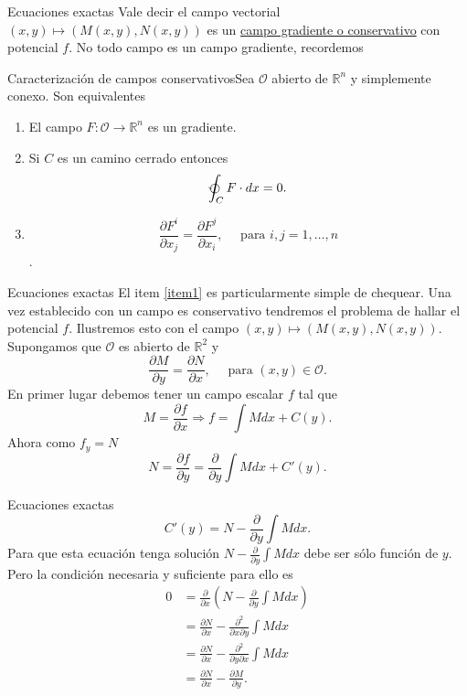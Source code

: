 \documentclass[handout,hyperref={colorlinks=true}]{beamer}
\newcommand{\rr}{\mathbb{R}}
\newcommand{\der}[2]{\frac{\partial #1}{\partial #2}}
\newcommand{\nl}{\onslide<+-> }
\begin{document}
\begin{frame}{Ecuaciones exactas}\label{camposconservativos}
\nl Vale decir el campo vectorial $(x,y)\mapsto (M(x,y),N(x,y))$ es un \href{http://es.wikipedia.org/wiki/Fuerza_conservativa}{campo 
gradiente o conservativo} con potencial $f$. No todo campo es un campo gradiente, recordemos

\nl \begin{block}{Caracterización de campos conservativos}Sea $\mathcal{O}$ abierto de $\rr^n$ y simplemente conexo. Son equivalentes
 \begin{enumerate}
  \item El campo $F:\mathcal{O}\to\rr^n$ es un gradiente.
  \item Si $C$ es un camino cerrado entonces
  \[\varointctrclockwise_C F\cdot d x=0.\]
  \item\label{item1} \[\frac{\partial F^i}{\partial x_j}=\frac{\partial F^j}{\partial x_i},\quad\text{ para }i,j=1,\ldots,n\]. 
 \end{enumerate}

\end{block}

\end{frame}

\begin{frame}{Ecuaciones exactas}
El item \ref{item1}  es particularmente simple de chequear. Una vez establecido con un campo es conservativo tendremos el problema de hallar el potencial $f$. 
Ilustremos esto con el campo $(x,y)\mapsto (M(x,y),N(x,y))$. Supongamos que $\mathcal{O}$ es abierto de $\rr^2$ y
\[\frac{\partial M}{\partial y}=\frac{\partial N}{\partial x},\quad\text{ para } (x,y)\in \mathcal{O}.\] 
En primer lugar debemos tener un campo escalar $f$ tal que
\[M=\frac{\partial f}{\partial x}\Rightarrow f=\int Mdx +C(y).\]
Ahora como $f_y=N$
\[N=\frac{\partial f}{\partial y}=\frac{\partial}{\partial y}\int Mdx +C'(y).\]

\end{frame}

\begin{frame}{Ecuaciones exactas}
\[C'(y)=N-\frac{\partial}{\partial y}\int Mdx .\]
\nl Para que esta ecuación tenga solución $N-\frac{\partial}{\partial y}\int Mdx$ debe ser sólo función de $y$. Pero la condición necesaria y suficiente para ello es 
\[\begin{split}0&=\frac{\partial}{\partial x}\left(N-\frac{\partial}{\partial y}\int Mdx\right)\\
&= \der{N}{x}-\frac{\partial^2}{\partial x\partial y}\int Mdx\\
&=\der{N}{x}-\frac{\partial^2}{\partial y\partial x}\int Mdx\\
&=\der{N}{x}-\der{M}{y}.
   \end{split}
\]
\end{frame}
\end{document}

